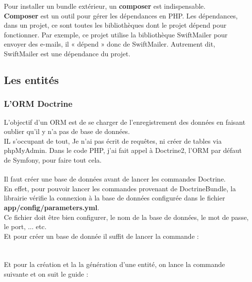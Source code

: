 \documentclass[12pt]{article}
\begin{document}
Pour installer un bundle extérieur, un \textbf{composer} est indispensable.\\
\textbf{Composer} est un outil pour gérer les dépendances en PHP. Les dépendances, dans un projet, ce sont toutes les bibliothèques dont le projet dépend pour fonctionner. Par exemple, ce  projet utilise la bibliothèque SwiftMailer pour envoyer des e-mails, il « dépend » donc de SwiftMailer. Autrement dit, SwiftMailer est une dépendance du projet.\\



\subsection{Les entités }

\subsubsection{L'ORM Doctrine}
L'objectif d'un ORM  est de se charger de l'enregistrement des  données en  faisant oublier qu'il y n'a pas de base de données. \\
IL s'occupant de tout, Je n'ai pas écrit de requêtes, ni créer de tables via phpMyAdmin. Dans le code PHP, j'ai  fait appel à Doctrine2, l'ORM par défaut de Symfony, pour faire tout cela.\\ \\

Il  faut créer une base de données avant de lancer les commandes Doctrine.\\
 En effet, pour pouvoir lancer les commandes provenant de DoctrineBundle, la librairie vérifie la connexion à la base de données configurée dans le fichier \textbf{ app/config/parameters.yml}. \\
 Ce fichier doit être bien configurer, le nom de la base de données, le mot de passe, le port, ... etc.\\
 Et pour créer un base de donnée il suffit de lancer la commande :\\
 \\
 \\
 Et pour la création et la la génération d'une entité, on lance la commande suivante et on suit le guide :\\
 \\
 
\\ 
\end{document}
